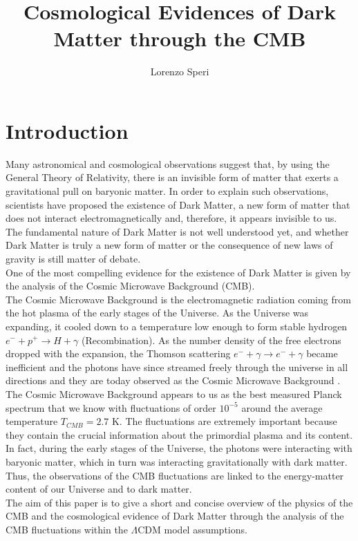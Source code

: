 \documentclass{article}
\title{Cosmological Evidences of Dark Matter through the CMB}
\author{Lorenzo Speri}
\date{}
\begin{document}
\maketitle

\vspace{3cm}
\section{Introduction}
Many astronomical and cosmological observations suggest that, by using the General Theory of Relativity, there is an invisible form of matter that exerts a gravitational pull on baryonic matter. 
In order to explain such observations, scientists have proposed the existence of Dark Matter, a new form of matter that does not interact electromagnetically and, therefore, it appears invisible to us. 
The fundamental nature of Dark Matter is not well understood yet, and whether Dark Matter is truly a new form of matter or the consequence of new laws of gravity is still matter of debate.\\
One of the most compelling evidence for the existence of Dark Matter is given by the analysis of the Cosmic Microwave Background (CMB).\\
The Cosmic Microwave Background is the electromagnetic radiation coming from the hot plasma of the early stages of the Universe.
As the Universe was expanding, it cooled down to a temperature low enough to form stable hydrogen $e^- + p^+  \rightarrow H + \gamma$ (Recombination). 
As the number density of the free electrons dropped with the expansion, the Thomson scattering $e^- + \gamma  \rightarrow e^- + \gamma$ became inefficient and the photons have since streamed freely through the universe in all directions and they are today observed as the Cosmic Microwave Background \citep{LecturesPdf}.\\
The Cosmic Microwave Background appears to us as the best measured Planck spectrum that we know with fluctuations of order $10 ^{-5}$ around the average temperature $T_{CMB} =2.7$ K.
The fluctuations are extremely important because they contain the crucial information about the primordial plasma and its content. 
In fact, during the early stages of the Universe, the photons were interacting with baryonic matter, which in turn was interacting gravitationally with dark matter.
Thus, the observations of the CMB fluctuations are linked to the energy-matter content of our Universe and to dark matter.\\
The aim of this paper is to give a short and concise overview of the physics of the CMB and the cosmological evidence of Dark Matter through the analysis of the CMB fluctuations within the $\Lambda$CDM model assumptions.\\
\end{document}
